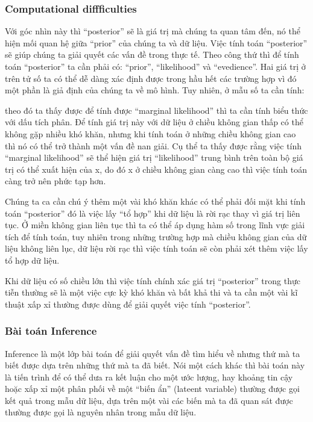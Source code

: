         \subsubsection{Computational diffficulties}
        Với góc nhìn này thì ``posterior'' sẽ là giá trị mà chúng ta quan tâm đến, nó thể hiện mối quan hệ giữa ``prior'' của chúng ta và dữ liệu. 
        Việc tính toán ``posterior'' sẽ giúp chúng ta giải quyết các vấn đề trong thực tế.
        Theo công thứ thì để tính toán ``posterior'' ta cần phải có: ``prior'', ``likelihood'' và ``evedience''. Hai giá trị ở trên tử số ta có thể dễ dàng xác định được trong hầu hết các trường hợp vì đó một phần là giả định của chúng ta về mô hình. Tuy nhiên, ở mẫu số ta cần tính:

        theo đó ta thấy được để tính được ``marginal likelihood'' thì ta cần tính biểu thức với dấu tích phân. Để tính giá trị này với dữ liệu ở chiều không gian thấp có thể không gặp nhiều khó khăn, nhưng khi tính toán ở những chiều không gian cao thì nó có thể trở thành một vấn đề nan giải. 
        Cụ thể ta thấy được rằng việc tính ``marginal likelihood'' sẽ thể hiện giá trị ``likelihood'' trung bình trên toàn bộ giá trị có thể xuất hiện của x, do đó x ở chiều không gian càng cao thì việc tính toán càng trở nên phức tạp hơn. 

        Chúng ta ca cần chú ý thêm một vài khó khăn khác có thể phải đối mặt khi tính toán ``posterior'' đó là việc lấy ``tổ hợp'' khi dữ liệu là rời rạc thay vì giá trị liên tục. 
        Ở miền không gian liên tục thì ta có thể áp dụng hàm số trong lĩnh vực giải tích để tính toán, tuy nhiên trong những trường hợp mà chiều không gian của dữ liệu không liên lục, dữ liệu rời rạc thì việc tính toán sẽ còn phải xét thêm việc lấy tổ hợp dữ liệu. 

        Khi dữ liệu có số chiều lớn thì việc tính chính xác giá trị ``posterior'' trong thực tiễn thường sẽ là một việc cực kỳ khó khăn và bất khả thi và ta cần một vài kĩ thuật xấp xỉ thường được dùng để giải quyết việc tính ``posterior''. 

        \subsubsection{Bài toán Inference}
        Inference là một lớp bài toán để giải quyết vấn đề tìm hiểu về nhưng thứ mà ta biết được dựa trên những thứ mà ta đã biết. Nói một cách khác thì bài toán này là tiến trình để có thể dưa ra kết luận cho một ước lượng, hay khoảng tin cậy hoặc xấp xỉ một phân phối về một ``biến ẩn'' (lateent variable) thường được gọi kết quả trong mẫu dữ liệu, dựa trên một vài các biến mà ta đã quan sát được thường được gọi là nguyên nhân trong mẫu dữ liệu. 


